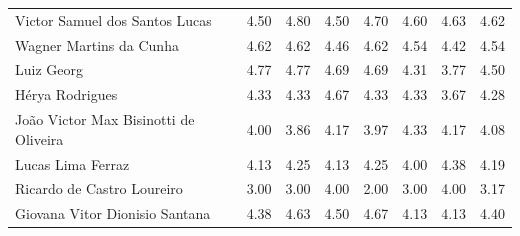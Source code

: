 \begin{landscape}
\begin{table}[p]
\begin{tabular}{lrrrrrrr}
            Victor Samuel dos Santos Lucas        & \num{4.50}          & \num{4.80}                & \num{4.50}            & \num{4.70} & \num{4.60} & \num{4.63} & \num{4.62} \\
            Wagner Martins da Cunha               & \num{4.62}          & \num{4.62}                & \num{4.46}            & \num{4.62} & \num{4.54} & \num{4.42} & \num{4.54} \\
            Luiz Georg                            & \num{4.77}          & \num{4.77}                & \num{4.69}            & \num{4.69} & \num{4.31} & \num{3.77} & \num{4.50} \\
            Hérya Rodrigues                       & \num{4.33}          & \num{4.33}                & \num{4.67}            & \num{4.33} & \num{4.33} & \num{3.67} & \num{4.28} \\
            João Victor Max Bisinotti de Oliveira & \num{4.00}          & \num{3.86}                & \num{4.17}            & \num{3.97} & \num{4.33} & \num{4.17} & \num{4.08} \\
            Lucas Lima Ferraz                     & \num{4.13}          & \num{4.25}                & \num{4.13}            & \num{4.25} & \num{4.00} & \num{4.38} & \num{4.19} \\
            Ricardo de Castro Loureiro            & \num{3.00}          & \num{3.00}                & \num{4.00}            & \num{2.00} & \num{3.00} & \num{4.00} & \num{3.17} \\
            Giovana Vitor Dionisio Santana        & \num{4.38}          & \num{4.63}                & \num{4.50}            & \num{4.67} & \num{4.13} & \num{4.13} & \num{4.40} \\
            \bottomrule
        \end{tabular}
    \end{table}

    \cleardoublepage

\end{landscape}

\cleardoublepage